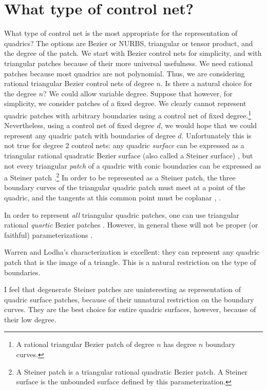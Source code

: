 

\section{What type of control net?}

What type of control net is 
the most appropriate for the representation of quadrics?
The options are Bezier or NURBS, triangular or tensor product,
and the degree of the patch.
We start with Bezier control nets for simplicity,
and with triangular patches because of their more universal
usefulness.
We need rational patches because most quadrics are not polynomial.
Thus, we are considering rational triangular Bezier control nets
of degree $n$.
Is there a natural choice for the degree $n$?
We could allow variable degree.
Suppose that however, for simplicity, we consider patches of a fixed degree.
We clearly cannot represent quadric patches with arbitrary boundaries
using a control net of fixed degree.\footnote{A
	rational triangular Bezier patch of degree $n$ has degree $n$
	boundary curves.}
Nevertheless, using a control net of fixed degree $d$, we would hope that
we could represent any quadric patch with boundaries of degree $d$.
Unfortunately this is not true for degree 2 control nets:
any quadric {\em surface} can be expressed as a triangular rational quadratic
Bezier surface (also called a Steiner surface) \cite[p. 84]{Seder83},
but not every triangular {\em patch} of a quadric with conic boundaries
can be expressed as a
Steiner patch \cite[p. 347]{FAR93}.\footnote{A Steiner patch is a 
	triangular rational quadratic Bezier patch.
	A Steiner surface is the unbounded surface defined by this 
	parameterization.}
In order to be represented as a Steiner patch, the three boundary curves
of the triangular quadric patch must meet
at a point of the quadric, and the tangents at this common point must 
be coplanar \cite[p. 34]{Seder85}, \cite[p. 7]{Boehm91}.

In order to represent {\em all} triangular quadric patches,
one can use triangular rational {\em quartic} Bezier patches
\cite[p. 347]{FAR93}.
However, in general these will not be proper (or faithful) parameterizations
\cite[p. 34]{Sed87}.

Warren and Lodha's characterization is excellent: they can represent
any quadric patch that is the image of a triangle.
This is a natural restriction on the type of boundaries.

I feel that degenerate Steiner patches are
uninteresting as representation of quadric surface patches, 
because of their unnatural restriction on the boundary curves.
They are the best choice for entire quadric surfaces, however,
because of their low degree.

